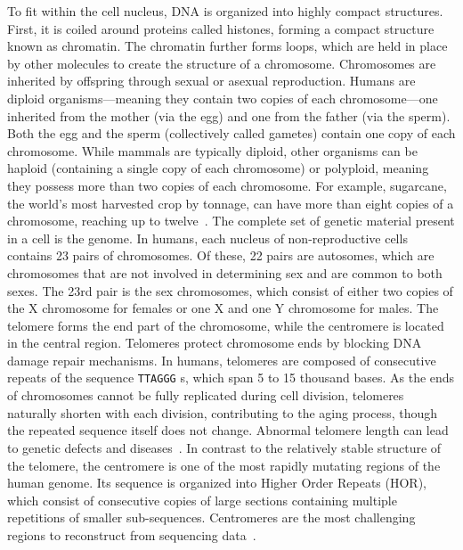 To fit within the cell nucleus, DNA is organized into highly compact structures. First, it is coiled around proteins called histones, forming a compact structure known as chromatin. The chromatin further forms loops, which are held in place by other molecules to create the structure of a chromosome. Chromosomes are inherited by offspring through sexual or asexual reproduction. Humans are diploid organisms—meaning they contain two copies of each chromosome—one inherited from the mother (via the egg) and one from the father (via the sperm). Both the egg and the sperm (collectively called gametes) contain one copy of each chromosome. While mammals are typically diploid, other organisms can be haploid (containing a single copy of each chromosome) or polyploid, meaning they possess more than two copies of each chromosome. For example, sugarcane, the world's most harvested crop by tonnage, can have more than eight copies of a chromosome, reaching up to twelve~\cite{sugarcane}.
The complete set of genetic material present in a cell is the genome. In humans, each nucleus of non-reproductive cells contains 23 pairs of chromosomes. Of these, 22 pairs are autosomes, which are chromosomes that are not involved in determining sex and are common to both sexes. The 23rd pair is the sex chromosomes, which consist of either two copies of the X chromosome for females or one X and one Y chromosome for males. The telomere forms the end part of the chromosome, while the centromere is located in the central region. Telomeres protect chromosome ends by blocking DNA damage repair mechanisms. In humans, telomeres are composed of consecutive repeats of the sequence \texttt{TTAGGG} s, which span 5 to 15 thousand bases. As the ends of chromosomes cannot be fully replicated during cell division, telomeres naturally shorten with each division, contributing to the aging process, though the repeated sequence itself does not change. Abnormal telomere length can lead to genetic defects and diseases~\cite{telomeres}. In contrast to the relatively stable structure of the telomere, the centromere is one of the most rapidly mutating regions of the human genome. Its sequence is organized into Higher Order Repeats (\gls{HOR}), which consist of consecutive copies of large sections containing multiple repetitions of smaller sub-sequences. Centromeres are the most challenging regions to reconstruct from sequencing data~\cite{centromeres_eichler}.

